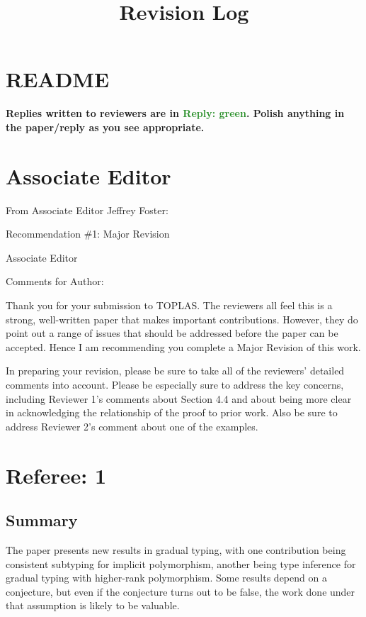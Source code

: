 \documentclass[dvipsnames]{article}
\title{Revision Log}
\author{}
\newcommand\reply[1]{\textcolor{ForestGreen}{Reply: #1}}
\begin{document}
\maketitle

\section{README}

\textbf{Replies written to reviewers are in \reply{green}. Polish anything in
  the paper/reply as you see appropriate.}


\section{Associate Editor}

From Associate Editor Jeffrey Foster: 

Recommendation \#1: Major Revision 

Associate Editor

Comments for Author:

Thank you for your submission to TOPLAS. The reviewers all feel this is a
strong, well-written paper that makes important contributions. However, they do
point out a range of issues that should be addressed before the paper can be
accepted. Hence I am recommending you complete a Major Revision of this work.

In preparing your revision, please be sure to take all of the reviewers'
detailed comments into account. Please be especially sure to address the key
concerns, including Reviewer 1's comments about Section 4.4 and about being more
clear in acknowledging the relationship of the proof to prior work. Also be sure
to address Reviewer 2's comment about one of the examples.

\section{Referee: 1}

\subsection{Summary}

The paper presents new results in gradual typing, with one contribution being
consistent subtyping for implicit polymorphism, another being type inference for
gradual typing with higher-rank polymorphism. Some results depend on a
conjecture, but even if the conjecture turns out to be false, the work done
under that assumption is likely to be valuable.
\end{document}
